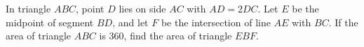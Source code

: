 In triangle $ABC$, point $D$ lies on side $AC$ with $AD=2DC$. Let $E$ be the midpoint of segment $BD$, and let $F$ be the intersection of line $AE$ with $BC$. If the area of triangle $ABC$ is $360$, find the area of triangle $EBF$.
